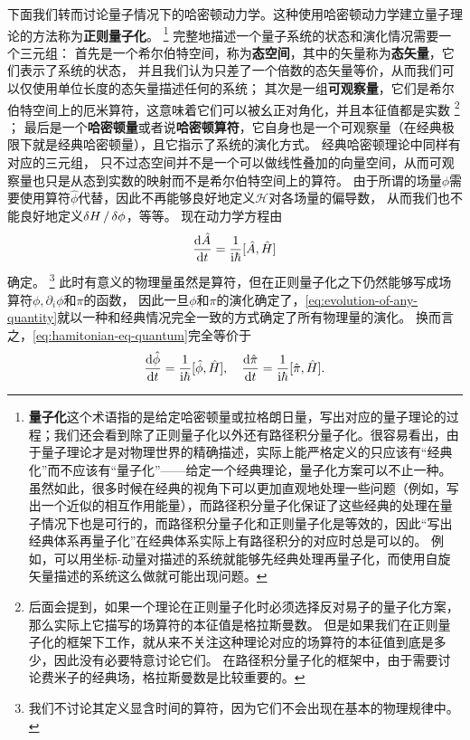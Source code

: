 \documentclass[UTF8, a4paper]{ctexart}
\newcommand*{\ii}{\mathrm{i}}
\begin{document}
下面我们转而讨论量子情况下的哈密顿动力学。这种使用哈密顿动力学建立量子理论的方法称为\textbf{正则量子化}。%
\footnote{
    \textbf{量子化}这个术语指的是给定哈密顿量或拉格朗日量，写出对应的量子理论的过程；我们还会看到除了正则量子化以外还有路径积分量子化。很容易看出，由于量子理论才是对物理世界的精确描述，实际上能严格定义的只应该有“经典化”而不应该有“量子化”——给定一个经典理论，量子化方案可以不止一种。
    虽然如此，很多时候在经典的视角下可以更加直观地处理一些问题（例如，写出一个近似的相互作用能量），而路径积分量子化保证了这些经典的处理在量子情况下也是可行的，而路径积分量子化和正则量子化是等效的，因此“写出经典体系再量子化”在经典体系实际上有路径积分的对应时总是可以的。
    例如，可以用坐标-动量对描述的系统就能够先经典处理再量子化，而使用自旋矢量描述的系统这么做就可能出现问题。
}%
完整地描述一个量子系统的状态和演化情况需要一个三元组：
首先是一个希尔伯特空间，称为\textbf{态空间}，其中的矢量称为\textbf{态矢量}，它们表示了系统的状态，
并且我们认为只差了一个倍数的态矢量等价，从而我们可以仅使用单位长度的态矢量描述任何的系统；
其次是一组\textbf{可观察量}，它们是希尔伯特空间上的厄米算符，这意味着它们可以被幺正对角化，并且本征值都是实数%
\footnote{后面会提到，如果一个理论在正则量子化时必须选择反对易子的量子化方案，那么实际上它描写的场算符的本征值是格拉斯曼数。
但是如果我们在正则量子化的框架下工作，就从来不关注这种理论对应的场算符的本征值到底是多少，因此没有必要特意讨论它们。
在路径积分量子化的框架中，由于需要讨论费米子的经典场，格拉斯曼数是比较重要的。}%
；
最后是一个\textbf{哈密顿量}或者说\textbf{哈密顿算符}，它自身也是一个可观察量（在经典极限下就是经典哈密顿量），且它指示了系统的演化方式。
经典哈密顿理论中同样有对应的三元组，
只不过态空间并不是一个可以做线性叠加的向量空间，从而可观察量也只是从态到实数的映射而不是希尔伯特空间上的算符。
由于所谓的场量$\phi$需要使用算符$\hat{\phi}$代替，因此不再能够良好地定义$\mathcal{H}$对各场量的偏导数，
从而我们也不能良好地定义$\var{H}/\var{\phi}$，等等。
现在动力学方程由
\begin{equation}
    \dv{\hat{A}}{t} = \frac{1}{\ii \hbar} [\hat{A}, \hat{H}]
    \label{eq:quantum-evolution}
\end{equation}
确定。%
\footnote{我们不讨论其定义显含时间的算符，因为它们不会出现在基本的物理规律中。}%
此时有意义的物理量虽然是算符，但在正则量子化之下仍然能够写成场算符$\phi, \partial_i \phi$和$\pi$的函数，
因此一旦$\phi$和$\pi$的演化确定了，\eqref{eq:evolution-of-any-quantity}就以一种和经典情况完全一致的方式确定了所有物理量的演化。
换而言之，\eqref{eq:hamitonian-eq-quantum}完全等价于
\begin{equation}
    \dv{\hat{\phi}}{t} = \frac{1}{\ii \hbar} [\hat{\phi}, \hat{H}], 
    \quad \dv{\hat{\pi}}{t} = \frac{1}{\ii \hbar} [\hat{\pi}, \hat{H}].
    \label{eq:hamitonian-eq-quantum}
\end{equation}
\end{document}
